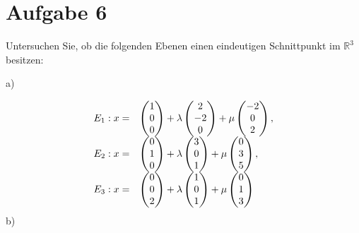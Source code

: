 \documentclass[main.tex]{subfiles}
\begin{document}
\section{Aufgabe 6}
Untersuchen Sie, ob die folgenden Ebenen einen eindeutigen Schnittpunkt im $\displaystyle \mathbb{R}^{3}$ besitzen:

a)


\begin{equation*}
\begin{array}{ l l }
E_{1} :x= & \begin{pmatrix}
1\\
0\\
0
\end{pmatrix} +\lambda \begin{pmatrix}
2\\
-2\\
0
\end{pmatrix} +\mu \begin{pmatrix}
-2\\
0\\
2
\end{pmatrix} ,\\
E_{2} :x= & \begin{pmatrix}
0\\
1\\
0
\end{pmatrix} +\lambda \begin{pmatrix}
3\\
0\\
1
\end{pmatrix} +\mu \begin{pmatrix}
0\\
3\\
5
\end{pmatrix} ,\\
E_{3} :x= & \begin{pmatrix}
0\\
0\\
2
\end{pmatrix} +\lambda \begin{pmatrix}
1\\
0\\
1
\end{pmatrix} +\mu \begin{pmatrix}
0\\
1\\
3
\end{pmatrix}
\end{array}
\end{equation*}
b)
\end{document}
